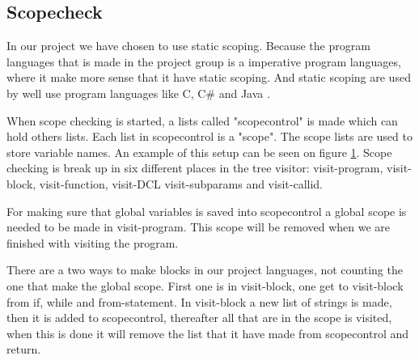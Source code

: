 \subsection{Scopecheck}
\label{sec:scopecheck}
In our project we have chosen to use static scoping. Because the program languages that is made in the project group is a imperative program languages, where it make more sense that it have static scoping. And static scoping are used by well use program languages like C, C\# and Java \citep{ProgrammingCommunityIndex}.

When scope checking is started, a lists called "scopecontrol" is made which can hold others lists. Each list in scopecontrol is a "scope". The scope lists are used to store variable names. An example of this setup can be seen on figure \ref{fig:scopediagram}. Scope checking is break up in six different places in the tree visitor: visit-program, visit-block, visit-function, visit-DCL visit-subparams and visit-callid.

\begin{figure}[H]
\label{fig:scopediagram}
\end{figure}

For making sure that global variables is saved into scopecontrol a global scope is needed to be made in visit-program. This scope will be removed when we are finished with visiting the program.

There are a two ways to make blocks in our project languages, not counting the one that make the global scope. First one is in visit-block, one get to visit-block from if, while and from-statement. In visit-block a new list of strings is made, then it is added to scopecontrol, thereafter all that are in the scope is visited, when this is done it will remove the list that it have made from scopecontrol and return.

